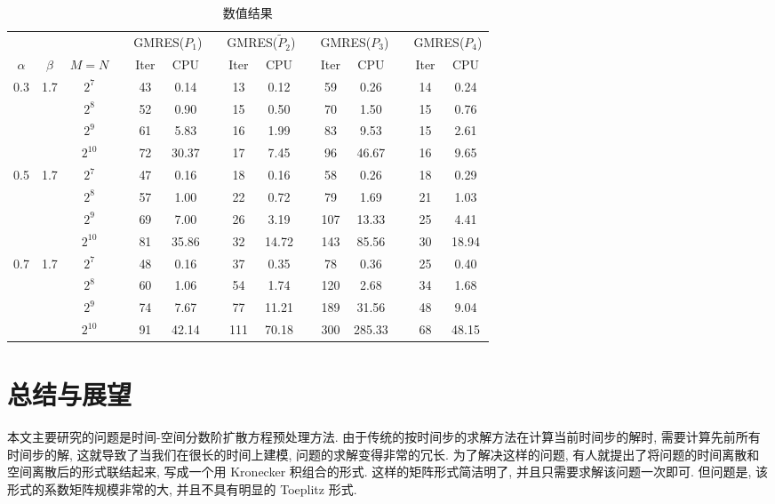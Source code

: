 \documentclass{ecnumaster}
\begin{document}
\begin{table}[H]
\centering
\caption{数值结果} \label{tab4-4-3}\smallskip
\begin{tabular}{ccccccccccccccc} \toprule
& &  && \multicolumn{2}{c}{GMRES($P_1$)}
&& \multicolumn{2}{c}{GMRES($\tilde{P}_2$)}
&& \multicolumn{2}{c}{GMRES($P_3$)}
&& \multicolumn{2}{c}{GMRES($P_4$)} \\
$\alpha$ & $\beta$ & $M = N$ && Iter & CPU && Iter & CPU
&& Iter & CPU && Iter & CPU\\ \midrule
0.3 & 1.7
 & $2^7$     && 43 &0.14   && 13 & 0.12  && 59 & 0.26   && 14 & 0.24  \\
&& $2^8$     && 52 &0.90   && 15 & 0.50  && 70 & 1.50   && 15 & 0.76  \\
&& $2^9$     && 61 &5.83   && 16 & 1.99  && 83 & 9.53   && 15 & 2.61  \\
&& $2^{10}$  && 72 &30.37  && 17 & 7.45  && 96 & 46.67  && 16 & 9.65  \\ \midrule
0.5 & 1.7
 & $2^7$     && 47 &0.16   && 18 & 0.16  && 58 & 0.26   && 18 & 0.29  \\
&& $2^8$     && 57 &1.00   && 22 & 0.72  && 79 & 1.69   && 21 & 1.03   \\
&& $2^9$     && 69 &7.00   && 26 & 3.19  && 107 & 13.33 && 25 & 4.41   \\
&& $2^{10}$  && 81 &35.86  && 32 & 14.72 && 143 & 85.56 && 30 & 18.94  \\ \midrule
0.7 & 1.7
 & $2^7$     && 48 &0.16   && 37 & 0.35  && 78 & 0.36   && 25 & 0.40   \\
&& $2^8$     && 60 &1.06   && 54 & 1.74  && 120 & 2.68  && 34 & 1.68   \\
&& $2^9$     && 74 &7.67   && 77 & 11.21 && 189 & 31.56 && 48 & 9.04   \\
&& $2^{10}$  && 91 &42.14  && 111 & 70.18&& 300 & 285.33&& 68 & 48.15  \\ \bottomrule
\end{tabular}
\end{table}




\chapter{总结与展望}
本文主要研究的问题是时间-空间分数阶扩散方程预处理方法.
由于传统的按时间步的求解方法在计算当前时间步的解时,
需要计算先前所有时间步的解,
这就导致了当我们在很长的时间上建模,
问题的求解变得非常的冗长.
为了解决这样的问题,
有人就提出了将问题的时间离散和空间离散后的形式联结起来,
写成一个用 Kronecker 积组合的形式.
这样的矩阵形式简洁明了,
并且只需要求解该问题一次即可.
但问题是,
该形式的系数矩阵规模非常的大,
并且不具有明显的 Toeplitz 形式.
\end{document}
